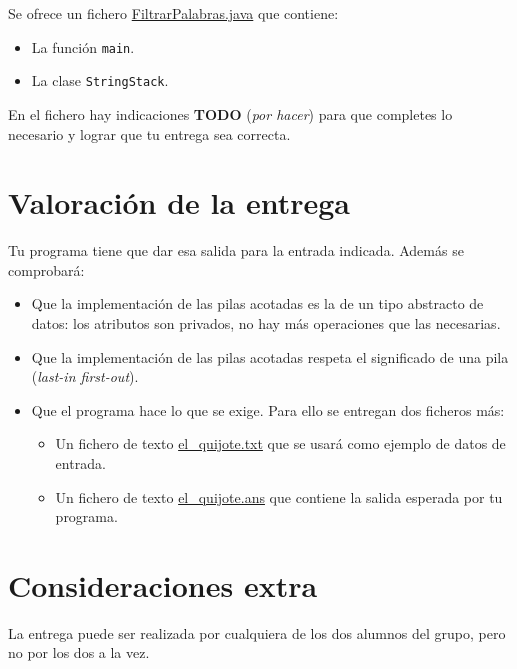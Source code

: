 \documentclass[12pt]{article}
\begin{document}
Se ofrece un fichero \url{FiltrarPalabras.java} que contiene:
\begin{itemize}
\item La función \lstinline{main}.
\item La clase \lstinline{StringStack}.
\end{itemize}

En el fichero hay indicaciones \textbf{TODO} (\emph{por hacer}) para que completes lo necesario y lograr que tu entrega sea correcta.

\section{Valoración de la entrega}

Tu programa tiene que dar esa salida para la entrada indicada. Además se comprobará:
\begin{itemize}
\item Que la implementación de las pilas acotadas es la de un tipo abstracto de datos: los atributos son privados, no hay más operaciones que las necesarias.
\item Que la implementación de las pilas acotadas respeta el significado de una pila (\emph{last-in first-out}).
\item Que el programa hace lo que se exige. Para ello se entregan dos ficheros más:
  \begin{itemize}
  \item Un fichero de texto \url{el_quijote.txt} que se usará como
    ejemplo de datos de entrada.
  \item Un fichero de texto \url{el_quijote.ans} que contiene la salida
    esperada por tu programa.
  \end{itemize}
\end{itemize}

\section{Consideraciones extra}

La entrega puede ser realizada por cualquiera de los dos alumnos del grupo, pero
no por los dos a la vez.
\end{document}
